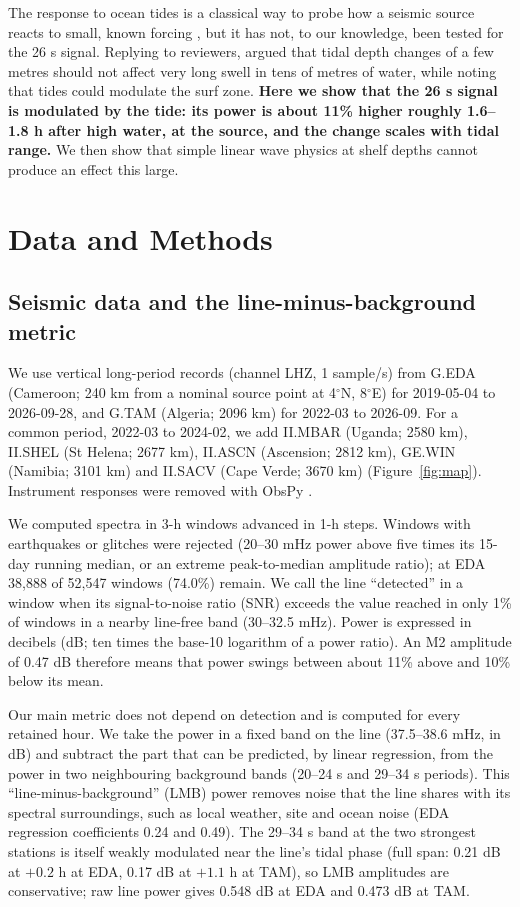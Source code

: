 \documentclass[11pt]{article}
\newcommand{\degr}{\ensuremath{^\circ}}
\begin{document}
The response to ocean tides is a classical way to probe how a seismic source reacts to small, known forcing \citep[e.g.,][]{rubinstein2008}, but it has not, to our knowledge, been tested for the 26 s signal. Replying to reviewers, \citet{poli2026} argued that tidal depth changes of a few metres should not affect very long swell in tens of metres of water, while noting that tides could modulate the surf zone. \textbf{Here we show that the 26 s signal is modulated by the tide: its power is about 11\% higher roughly 1.6--1.8 h after high water, at the source, and the change scales with tidal range.} We then show that simple linear wave physics at shelf depths cannot produce an effect this large.

\section{Data and Methods}
\subsection{Seismic data and the line-minus-background metric}
We use vertical long-period records (channel LHZ, 1 sample/s) from G.EDA (Cameroon; 240 km from a nominal source point at 4\degr N, 8\degr E) for 2019-05-04 to 2026-09-28, and G.TAM (Algeria; 2096 km) for 2022-03 to 2026-09. For a common period, 2022-03 to 2024-02, we add II.MBAR (Uganda; 2580 km), II.SHEL (St Helena; 2677 km), II.ASCN (Ascension; 2812 km), GE.WIN (Namibia; 3101 km) and II.SACV (Cape Verde; 3670 km) (Figure~\ref{fig:map}). Instrument responses were removed with ObsPy \citep{beyreuther2010}.

We computed spectra in 3-h windows advanced in 1-h steps. Windows with earthquakes or glitches were rejected (20--30 mHz power above five times its 15-day running median, or an extreme peak-to-median amplitude ratio); at EDA 38,888 of 52,547 windows (74.0\%) remain. We call the line ``detected'' in a window when its signal-to-noise ratio (SNR) exceeds the value reached in only 1\% of windows in a nearby line-free band (30--32.5 mHz). Power is expressed in decibels (dB; ten times the base-10 logarithm of a power ratio). An M2 amplitude of 0.47 dB therefore means that power swings between about 11\% above and 10\% below its mean.

Our main metric does not depend on detection and is computed for every retained hour. We take the power in a fixed band on the line (37.5--38.6 mHz, in dB) and subtract the part that can be predicted, by linear regression, from the power in two neighbouring background bands (20--24 s and 29--34 s periods). This ``line-minus-background'' (LMB) power removes noise that the line shares with its spectral surroundings, such as local weather, site and ocean noise (EDA regression coefficients 0.24 and 0.49). The 29--34 s band at the two strongest stations is itself weakly modulated near the line's tidal phase (full span: 0.21 dB at $+0.2$ h at EDA, 0.17 dB at $+1.1$ h at TAM), so LMB amplitudes are conservative; raw line power gives 0.548 dB at EDA and 0.473 dB at TAM.
\end{document}
